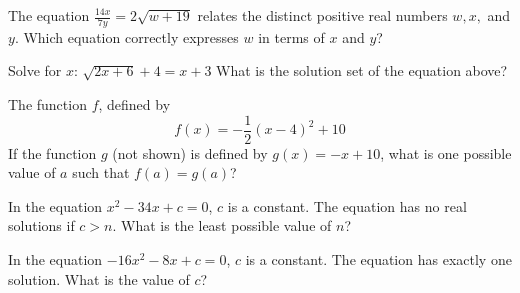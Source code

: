The equation \(\frac{14x}{7y} = 2\sqrt{w + 19}\)  
relates the distinct positive real numbers \(w, x,\) and \(y\).  
Which equation correctly expresses \(w\) in terms of \(x\) and \(y\)?

\vspace{0.75em}


\vspace{2em}

\noindent\markforreview
\vspace{1em}

Solve for \(x\): \(\sqrt{2x + 6} + 4 = x + 3\)  
What is the solution set of the equation above?

\vspace{0.75em}




\noindent\markforreview
\vspace{1em}

The function \(f\), defined by  
\[
f(x) = -\frac{1}{2}(x - 4)^2 + 10
\]  
 If the function \(g\) (not shown) is defined by  
\(g(x) = -x + 10\), what is one possible value of \(a\) such that \(f(a) = g(a)\)?

\vspace{0.75em}



\vspace{5em}

\noindent\markforreview
\vspace{1em}

In the equation \(x^2 - 34x + c = 0\), \(c\) is a constant.  
The equation has no real solutions if \(c > n\).  
What is the least possible value of \(n\)?

\vspace{5em}

\noindent\markforreview
\vspace{1em}

In the equation \(-16x^2 - 8x + c = 0\), \(c\) is a constant.  
The equation has exactly one solution.  
What is the value of \(c\)?

\vspace{0.75em}

\newpage
\noindent\markforreview
\vspace{1em}

